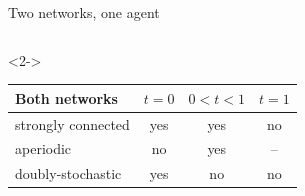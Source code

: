 \documentclass[10pt, aspectratio=169]{beamer}
\begin{document}
\begin{frame}[label=m-networks]{Two networks, one agent}
\begin{columns}[T]
      \begin{uncoverenv}<2->
      \vspace{1mm}%
      {\scriptsize
      \renewcommand{\arraystretch}{1.1}
      \begin{tabular}{@{}lccc@{}}
        \toprule
        Both networks & $t = 0$ & $0 < t < 1$ & $t = 1$ \\
        \midrule
        strongly connected & yes & yes & no \\
        aperiodic          & no  & yes & -- \\
        doubly-stochastic  & yes & no  & no \\
        \bottomrule
      \end{tabular}

}
\end{uncoverenv}
\end{columns}
\end{frame}
\end{document}
